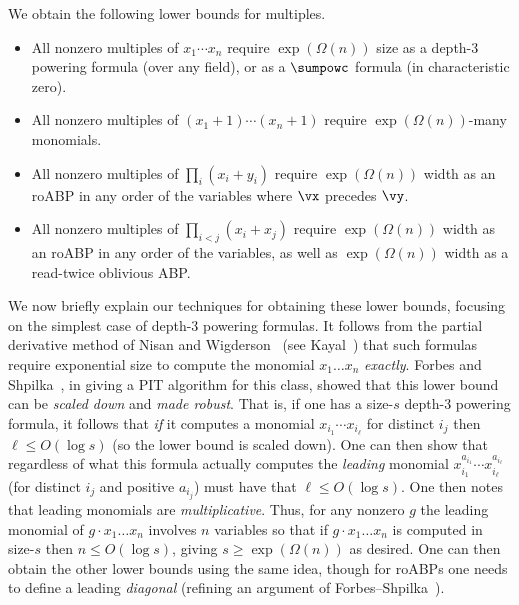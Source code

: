 \documentclass{toc}
\begin{document}
\begin{theorem}
        We obtain the following lower bounds for multiples.

        \begin{itemize}
        \item All nonzero multiples of $x_1\cdots x_n$ require
$\exp(\Omega(n))$ size
as a depth-3 powering formula (over any field), or as a $\sumpowc$ formula (in characteristic zero).
\item All nonzero multiples of $(x_1+1)\cdots (x_n+1)$ require $\exp(\Omega(n))$-many monomials.
\item All nonzero multiples of $\prod_i (x_i+y_i)$ require
$\exp(\Omega(n))$ width as an roABP in any
order of the variables where $\vx$ precedes $\vy$.
\item All nonzero multiples of $\prod_{i<j} (x_i+x_j)$ require
$\exp(\Omega(n))$ width as an roABP in any
order of the variables, as well as
$\exp(\Omega(n))$ width as a read-twice oblivious ABP.
                        \qedhere
        \end{itemize}
\end{theorem}

We now briefly explain our techniques for obtaining these lower bounds, focusing on the simplest case of depth-3 powering formulas.  It follows from the partial derivative method of Nisan and Wigderson~\cite{NisanWigderson94} (see Kayal~\cite{Kayal08}) that such formulas require exponential size to compute the monomial $x_1\ldots x_n$ \emph{exactly}.  Forbes and Shpilka~\cite{ForbesShpilka13a}, in giving a PIT algorithm for this class, showed that this lower bound can be \emph{scaled down} and \emph{made robust}.  That is, if one has a size-$s$ depth-3 powering formula, it follows that \emph{if} it computes a monomial $x_{i_1}\cdots x_{i_\ell}$ for distinct $i_j$ then $\ell\le O(\log s)$ (so the lower bound is scaled down).  One can then show that regardless of what this formula actually computes the \emph{leading} monomial $x_{i_1}^{a_{i_1}}\cdots x_{i_\ell}^{a_{i_\ell}}$ (for distinct $i_j$ and positive $a_{i_j}$) must have that $\ell\le O(\log s)$.  One then notes that leading monomials are \emph{multiplicative}.  Thus, for any nonzero $g$ the leading monomial of $g\cdot x_1\ldots x_n$ involves $n$ variables so that if $g\cdot x_1\ldots x_n$ is computed in size-$s$ then $n\le O(\log s)$, giving $s\ge\exp(\Omega(n))$ as desired.  One can then obtain the other lower bounds using the same idea, though for roABPs one needs to define a leading \emph{diagonal} (refining an argument of  Forbes--Shpilka~\cite{ForbesShpilka12}).
\end{document}
